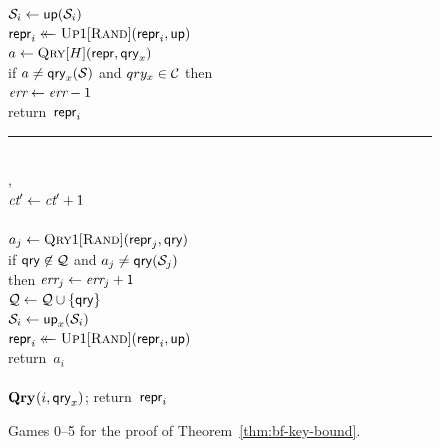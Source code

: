 \begin{figure}
{      $\mathcal{S}_i \gets \mathsf{up}(\mathcal{S}_i)$\\
      $\mathsf{repr}_i \mathrel{\leftarrow\mkern-14mu\leftarrow} \textsc{Up}1[\textsc{Rand}](\mathsf{repr}_i,\mathsf{up})$\\
      $a \gets \textsc{Qry}[H](\mathsf{repr}, \mathsf{qry}_x)$\\
      if $a \neq \mathsf{qry}_x(\mathcal{S})$ and $qry_x \in \mathcal{C}$ then\\
      \tab $\textit{err} \gets \textit{err}-1$\\
      return~$\mathsf{repr}_i$
    \\[3pt]
    \hspace*{-4pt}\rule{1.049\textwidth}{.4pt}
    \\[2pt]
    ,\hfill{}\hspace*{0pt}\\[2pt]
      $\textit{ct}' \gets \textit{ct}' + 1$\\
      \\
      \tab $a_j \gets \textsc{Qry}1[\textsc{Rand}](\mathsf{repr}_j, \mathsf{qry})$\\
      \tab if  $\mathsf{qry}\not\in\mathcal{Q}$ and $a_j \ne \mathsf{qry}(\mathcal{S}_j)$\\
      \tab\tab then $\textit{err}_j \gets \textit{err}_j + 1$\\
       $\mathcal{Q} \gets \mathcal{Q} \cup \{\mathsf{qry}\}$\\
      $\mathcal{S}_i \gets \mathsf{up}_x(\mathcal{S}_i)$\\
      $\mathsf{repr}_i \mathrel{\leftarrow\mkern-14mu\leftarrow} \textsc{Up}1[\textsc{Rand}](\mathsf{repr}_i,\mathsf{up})$\\
      return~$a_i$
    \\[2pt]
    \\[2pt]
      $\mathbf{Qry}\hspace{0.5pt}(i, \mathsf{qry}_x)$; return~$\mathsf{repr}_i$\\
  }
  \caption{Games 0--5 for the proof of
  Theorem~\ref{thm:bf-key-bound}.}
  \label{fig:bf-prf-correct}
\end{figure}

